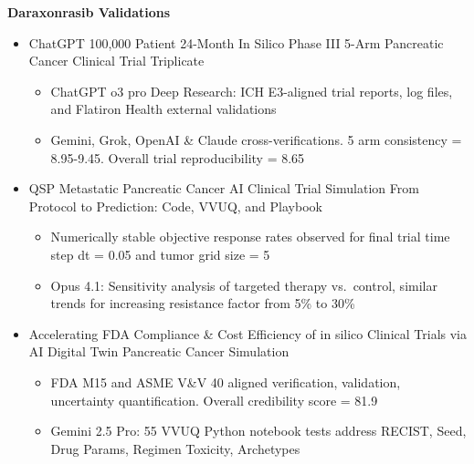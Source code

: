 \documentclass{article}
\begin{document}
\raggedright \textbf{Daraxonrasib Validations} \cite{16KawchakPaper, 17KawchakPaper, 18KawchakPaper}
\vspace{-0.1em}
\begin{itemize}[leftmargin=2.5em, itemsep=0em, topsep=0em]
    \item[1)] \fontsize{9.5pt}{10.5pt}\selectfont ChatGPT 100,000 Patient 24-Month In Silico Phase III 5-Arm Pancreatic Cancer Clinical Trial Triplicate  
    \begin{itemize} [leftmargin=1em, itemsep=0em, topsep=-0.08em] \fontsize{9.5pt}{10.5pt}\selectfont
    \item[\raisebox{0.25ex}{\scalebox{0.7}{$\bullet$}}] ChatGPT o3 pro Deep Research: ICH E3-aligned trial reports, log files, and Flatiron Health external validations \cite{FlatironHealth}
    \item[\raisebox{0.25ex}{\scalebox{0.7}{$\bullet$}}] Gemini, Grok, OpenAI \& Claude cross-verifications. 5 arm consistency = 8.95-9.45. Overall trial reproducibility = 8.65
    \end{itemize}
    \end{itemize}
    \begin{itemize}[leftmargin=2.5em, itemsep=0em, topsep=-0.3em]
    \item[2)] \fontsize{9.5pt}{10.5pt}\selectfont QSP Metastatic Pancreatic Cancer AI Clinical Trial Simulation From Protocol to Prediction: Code, VVUQ, and Playbook  
    \begin{itemize} [leftmargin=1em, itemsep=0em, topsep=-0.08em] \fontsize{9.5pt}{10.5pt}\selectfont
    \item[\raisebox{0.25ex}{\scalebox{0.7}{$\bullet$}}] Numerically stable objective response rates observed for final trial time step dt = 0.05 and tumor grid size = 5   
    \item[\raisebox{0.25ex}{\scalebox{0.7}{$\bullet$}}] Opus 4.1: Sensitivity analysis of targeted therapy vs.\ control, similar trends for increasing resistance factor from 5\% to 30\%
    \end{itemize}
    \item[3)] \fontsize{9.5pt}{10.5pt}\selectfont Accelerating FDA Compliance \& Cost Efficiency of in silico Clinical Trials via AI Digital Twin Pancreatic Cancer Simulation  
    \begin{itemize} [leftmargin=1em, itemsep=0em, topsep=-0.08em] \fontsize{9.5pt}{10.5pt}\selectfont
    \item[\raisebox{0.25ex}{\scalebox{0.7}{$\bullet$}}] FDA M15 and ASME V\&V 40 aligned verification, validation, uncertainty quantification. Overall credibility score = 81.9
    \item[\raisebox{0.25ex}{\scalebox{0.7}{$\bullet$}}] Gemini 2.5 Pro: 55 VVUQ Python notebook tests address RECIST, Seed, Drug Params, Regimen Toxicity, Archetypes 
    \end{itemize}
\end{itemize}
\vspace{0.1cm}
\end{document}

